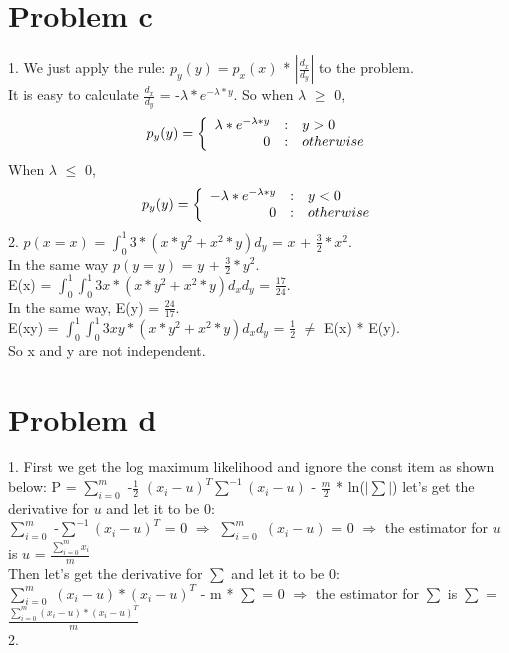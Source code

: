 \documentclass[twoside,11pt]{homework}
\begin{document}
\maketitle

\section*{Problem c}
1. We just apply the rule: $p_{y}(y) = p_{x}(x)$ * $|\frac{d_{x}}{d_{y}}|$ to the problem. \\
It is easy to calculate $\frac{d_{x}}{d_{y}}$ = -$\lambda * e^{-\lambda * y}$.
So when $\lambda$ $\ge$ 0,  \\
\begin{equation} 
p_{y}(y) = 
\left\{ 
\begin{array} 
    {r@{\quad:\quad}l} 
    \lambda * e^{-\lambda * y} & y > 0 \\ 
    0  &  otherwise
\end{array} 
\right. 
\end{equation}	
When $\lambda$ $\le$ 0, \\
\begin{equation} 
p_{y}(y) = 
\left\{ 
\begin{array} 
    {r@{\quad:\quad}l} 
    -\lambda * e^{-\lambda * y} & y < 0 \\ 
    0  &  otherwise
\end{array} 
\right. 
\end{equation}	
2. $p(x = x)$ = $\int_{0}^{1} 3*(x*y^{2} + x^{2} * y) d_{y}$ = $x$ + $\frac{3}{2} * x^{2}$. \\
In the same way $p(y = y)$ =  $y$ + $\frac{3}{2} * y^{2}$. \\
E(x) =  $\int_{0}^{1} \int_{0}^{1} 3x *(x*y^{2} + x^{2} * y) d_{x}d_{y}$ = $\frac{17}{24}$. \\
In the same way, E(y) =  $\frac{24}{17}$. \\
E(xy) = $\int_{0}^{1} \int_{0}^{1} 3xy *(x*y^{2} + x^{2} * y) d_{x}d_{y}$ = $\frac{1}{2}$ $\neq$ E(x) * E(y). \\
So x and y are not independent.
\section*{Problem d}
1. First we get the log maximum likelihood and ignore the const item as shown below:
P = $\sum_{i=0}^{m}$ -$\frac{1}{2}$ $(x_{i} - u)^{T} \sum^{-1} (x_{i} - u)$ - $\frac{m}{2}$ * ln($|\sum|$)
let's get the derivative for $u$ and let it to be 0: \\
$\sum_{i=0}^{m}$ -$\sum^{-1} (x_{i} - u)^{T}$ = 0 $\Longrightarrow$ $\sum_{i=0}^{m}$ $(x_{i} - u)$ = 0 $\Longrightarrow$ the estimator for $u$ is $u$ = $\frac{\sum_{i=0}^{m}x_{i}}{m}$  \\
Then let's get the derivative for $\sum$ and let it to be 0: \\
 $\sum_{i=0}^{m}$ $(x_{i} - u) * (x_{i} - u)^{T}$ - m * $\sum$ = 0 $\Longrightarrow$ the estimator for $\sum$ is $\sum$ = $\frac{\sum_{i=0}^{m} (x_{i} - u) * (x_{i} - u)^{T}}{m}$ \\
 2. 
\end{document}
